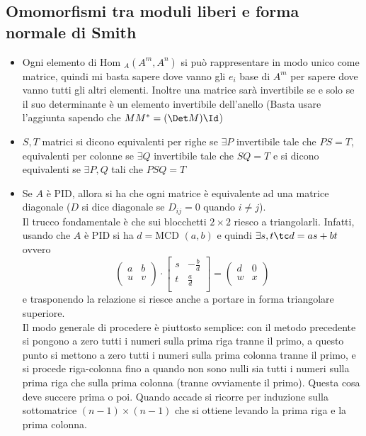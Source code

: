 \documentclass[a4paper,NoNotes,GeneralMath]{stdmdoc}
\newcommand{\MCD}{\text{MCD }}
\newcommand{\Hom}{\text{Hom }}
\begin{document}
	\subsection*{Omomorfismi tra moduli liberi e forma normale di Smith}
	\begin{itemize}
		\item Ogni elemento di $\Hom_A(A^m, A^n)$ si può rappresentare in modo unico come matrice, quindi mi basta sapere dove vanno gli $e_i$ base di $A^m$ per sapere dove vanno tutti gli altri elementi. Inoltre una matrice sarà invertibile se e solo se il suo determinante è un elemento invertibile dell'anello (Basta usare l'aggiunta sapendo che $M M^* = (\Det M) \Id$)
		\item $S, T$ matrici si dicono equivalenti per righe se $\exists P$ invertibile tale che $PS = T$, equivalenti per colonne se $\exists Q$ invertibile tale che $SQ = T$ e si dicono equivalenti se $\exists P, Q$ tali che $PSQ = T$
		\item Se $A$ è PID, allora si ha che ogni matrice è equivalente ad una matrice diagonale ($D$ si dice diagonale se $D_{ij} = 0$ quando $i \neq j$). \\
			Il trucco fondamentale è che sui blocchetti $2\times 2$ riesco a triangolarli. Infatti, usando che $A$ è PID si ha $d = \MCD(a, b)$ e quindi $\exists s, t \tc d = as + bt$ ovvero $$ \left( \begin{array}{cc} a & b \\ u & v \\ \end{array} \right) \cdot \left[ \begin{array}{cc} s & - \frac{b}{d} \\ t & \frac{a}{d} \\ \end{array} \right] = \left( \begin{array}{cc} d & 0 \\ w & x \\ \end{array} \right)$$ e trasponendo la relazione si riesce anche a portare in forma triangolare superiore. \\
			Il modo generale di procedere è piuttosto semplice: con il metodo precedente si pongono a zero tutti i numeri sulla prima riga tranne il primo, a questo punto si mettono a zero tutti i numeri sulla prima colonna tranne il primo, e si procede riga-colonna fino a quando non sono nulli sia tutti i numeri sulla prima riga che sulla prima colonna (tranne ovviamente il primo). Questa cosa deve succere prima o poi. Quando accade si ricorre per induzione sulla sottomatrice $(n-1) \times (n-1)$ che si ottiene levando la prima riga e la prima colonna.

\end{itemize}
\end{document}

